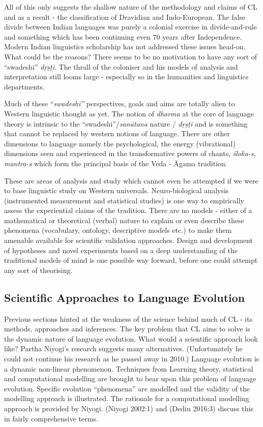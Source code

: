 All of this only suggests the shallow nature of the methodology and claims of CL and as a result - the classification of Dravidian and Indo-European. The false divide between Indian languages was purely a colonial exercise in divide-and-rule and something which has been continuing even 70 years after Independence. Modern Indian linguistics scholarship has not addressed these issues head-on. What could be the reasons? There seems to be no motivation to have any sort of “swadeshi” \textit{dṛṣṭi}. The thrall of the coloniser and his models of analysis and interpretation still looms large - especially so in the humanities and linguistics departments.

Much of these “\textit{swadeshi”} perspectives, goals and aims are totally alien to Western linguistic thought as yet. The notion of \textit{dharma} at the core of language theory is intrinsic to the “swadeshi”/\textit{sanātana} nature / \textit{dṛṣṭi} and is something that cannot be replaced by western notions of language. There are other dimensions to language namely the psychological, the energy (vibrational) dimensions seen and experienced in the transformative powers of chants, \textit{śloka-s, mantra-s} which form the principal basis of the Veda - Āgama tradition.

These are areas of analysis and study which cannot even be attempted if we were to base linguistic study on Western universals. Neuro-biological analysis (instrumented measurement and statistical studies) is one way to empirically assess the experiential claims of the tradition. There are no models - either of a mathematical or theoretical (verbal) nature to explain or even describe these phenomena (vocabulary, ontology, descriptive models etc.) to make them amenable available for scientific validation approaches. Design and development of hypotheses and novel experiments based on a deep understanding of the traditional models of mind is one possible way forward, before one could attempt any sort of theorising.


\subsection*{Scientific Approaches to Language Evolution}

Previous sections hinted at the weakness of the science behind much of CL - its methods, approaches and inferences. The key problem that CL aims to solve is the dynamic nature of language evolution. What would a scientific approach look like? Partha Niyogi’s research suggests many alternatives. (Unfortunately he could not continue his research as he passed away in 2010.) Language evolution is a dynamic non-linear phenomenon. Techniques from Learning theory, statistical and computational modelling are brought to bear upon this problem of language evolution. Specific evolution “phenomena” are modelled and the validity of the modelling approach is illustrated. The rationale for a computational modelling approach is provided by Niyogi. (Niyogi 2002:1) and (Dediu 2016:3) discuss this in fairly comprehensive terms.

